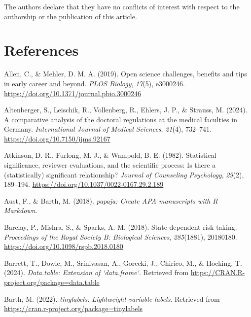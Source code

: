 \documentclass[
  british,
  a4paper,
  ,man,mask,floatsintext]{apa6}
\newlength{\cslhangindent}
\newenvironment{CSLReferences}[2] %
 {\begin{list}{}{%
  \setlength{\itemindent}{0pt}
  \setlength{\leftmargin}{0pt}
  \setlength{\parsep}{0pt}
  \ifodd #1
   \setlength{\leftmargin}{\cslhangindent}
   \setlength{\itemindent}{-1\cslhangindent}
  \fi
  \setlength{\itemsep}{#2\baselineskip}}}
 {\end{list}}
\begin{document}
The authors declare that they have no conflicts of interest with respect to the authorship or the publication of this article.

\section{References}\label{references}

\setlength{\parindent}{-0.2in}
\setlength{\leftskip}{0.2in}


\label{refs}
\begin{CSLReferences}{1}{0}
Allen, C., \& Mehler, D. M. A. (2019). Open science challenges, benefits and tips in early career and beyond. \emph{PLOS Biology}, \emph{17}(5), e3000246. \url{https://doi.org/10.1371/journal.pbio.3000246}

Altenberger, S., Leischik, R., Vollenberg, R., Ehlers, J. P., \& Strauss, M. (2024). A comparative analysis of the doctoral regulations at the medical faculties in {Germany}. \emph{International Journal of Medical Sciences}, \emph{21}(4), 732--741. \url{https://doi.org/10.7150/ijms.92167}

Atkinson, D. R., Furlong, M. J., \& Wampold, B. E. (1982). Statistical significance, reviewer evaluations, and the scientific process: {Is} there a (statistically) significant relationship? \emph{Journal of Counseling Psychology}, \emph{29}(2), 189--194. \url{https://doi.org/10.1037/0022-0167.29.2.189}

Aust, F., \& Barth, M. (2018). \emph{{papaja}: {Create APA} manuscripts with {R Markdown}}.

Barclay, P., Mishra, S., \& Sparks, A. M. (2018). State-dependent risk-taking. \emph{Proceedings of the Royal Society B: Biological Sciences}, \emph{285}(1881), 20180180. \url{https://doi.org/10.1098/rspb.2018.0180}

Barrett, T., Dowle, M., Srinivasan, A., Gorecki, J., Chirico, M., \& Hocking, T. (2024). \emph{Data.table: Extension of `data.frame`}. Retrieved from \url{https://CRAN.R-project.org/package=data.table}

Barth, M. (2022). \emph{{tinylabels}: Lightweight variable labels}. Retrieved from \url{https://cran.r-project.org/package=tinylabels}


\end{CSLReferences}
\end{document}
